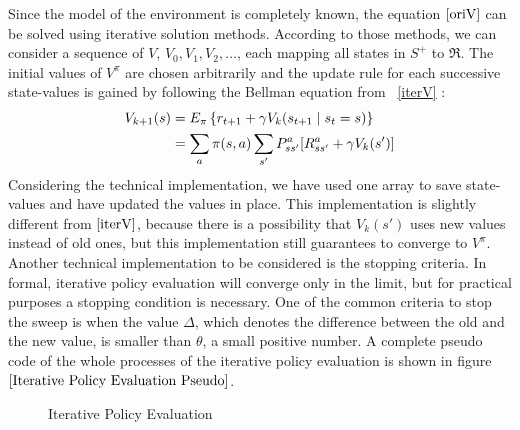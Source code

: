\documentclass[paper=a4, fontsize=11pt]{scrartcl}
\numberwithin{equation}{section}		%
\numberwithin{figure}{section}			%
\numberwithin{table}{section}				%
\begin{document}
Since the model of the environment is completely known, the equation $\eqref{oriV}$ can be solved using iterative solution methods. According to those methods, we can consider a sequence of $V$, $V_0, V_1, V_2, \dots$, each mapping all states in $S^+$ to $\Re$. The initial values of $V^\pi$ are chosen arbitrarily and the update rule for each successive state-values is gained by following the Bellman equation from ~\ref{iterV} :
\begin{align}
V_{k+1}(s) &= E_\pi\left\lbrace r_{t+1}+\gamma V_{k}(s_{t+1}\mid s_t=s) \right\rbrace\notag\\
&=\sum_{a}\pi(s,a)\sum_{s'}P_{ss'}^a [R_{ss'}^a+\gamma V_k(s')] \label{iterV}
\end{align}
Considering the technical implementation, we have used one array to save state-values and have updated the values in place. This implementation is slightly different from $\eqref{iterV}$, because there is a possibility that $V_k(s')$ uses new values  instead of old ones, but this implementation still guarantees to converge to $V^\pi$. Another technical implementation to be considered is the stopping criteria. In formal, iterative policy evaluation will converge only in the limit, but for practical purposes a stopping condition is necessary. One of the common criteria to stop the sweep is when the value $\Delta$, which denotes the difference between the old and the new value, is smaller than $\theta$, a small positive number. A complete pseudo code of the whole processes of the iterative policy evaluation is shown in figure $\ref{Iterative Policy Evaluation Pseudo}$.
\begin{figure}[H] \centering
\caption{Iterative Policy Evaluation ~\cite{suttonBarto}} \label{Iterative Policy Evaluation Pseudo}
\end{figure}
\end{document}
